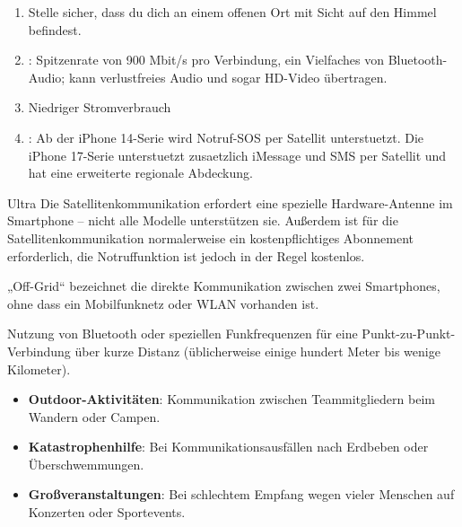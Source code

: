 
\begin{enumerate}
  \item Stelle sicher, dass du dich an einem offenen Ort mit Sicht auf den Himmel befindest.
  \item : Spitzenrate von 900 Mbit/s pro Verbindung, ein Vielfaches von Bluetooth-Audio; kann verlustfreies Audio und sogar HD-Video übertragen.
  \item Niedriger Stromverbrauch
  \item : Ab der iPhone 14-Serie wird Notruf-SOS per Satellit unterstuetzt. Die iPhone 17-Serie unterstuetzt zusaetzlich iMessage und SMS per Satellit und hat eine erweiterte regionale Abdeckung.
\end{enumerate}

\begin{tcbinfo}{Ultra}
Die Satellitenkommunikation erfordert eine spezielle Hardware-Antenne im Smartphone – nicht alle Modelle unterstützen sie. Außerdem ist für die Satellitenkommunikation normalerweise ein kostenpflichtiges Abonnement erforderlich, die Notruffunktion ist jedoch in der Regel kostenlos.

\end{tcbinfo}


„Off-Grid“ bezeichnet die direkte Kommunikation zwischen zwei Smartphones, ohne dass ein Mobilfunknetz oder WLAN vorhanden ist.


Nutzung von Bluetooth oder speziellen Funkfrequenzen für eine Punkt-zu-Punkt-Verbindung über kurze Distanz (üblicherweise einige hundert Meter bis wenige Kilometer).


\begin{itemize}
  \item \textbf{Outdoor-Aktivitäten}: Kommunikation zwischen Teammitgliedern beim Wandern oder Campen.
  \item \textbf{Katastrophenhilfe}: Bei Kommunikationsausfällen nach Erdbeben oder Überschwemmungen.
  \item \textbf{Großveranstaltungen}: Bei schlechtem Empfang wegen vieler Menschen auf Konzerten oder Sportevents.
\end{itemize}


